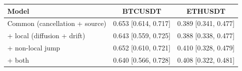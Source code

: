 \begin{tabular}{lcc}
\toprule
Model & BTCUSDT & ETHUSDT \\
\midrule
Common (cancellation + source) & 0.653 [0.614, 0.717] & 0.389 [0.341, 0.477] \\
+ local (diffusion + drift) & 0.643 [0.559, 0.725] & 0.388 [0.338, 0.477] \\
+ non-local jump & 0.652 [0.610, 0.721] & 0.410 [0.328, 0.479] \\
+ both & 0.640 [0.566, 0.728] & 0.408 [0.322, 0.481] \\
\bottomrule
\end{tabular}
